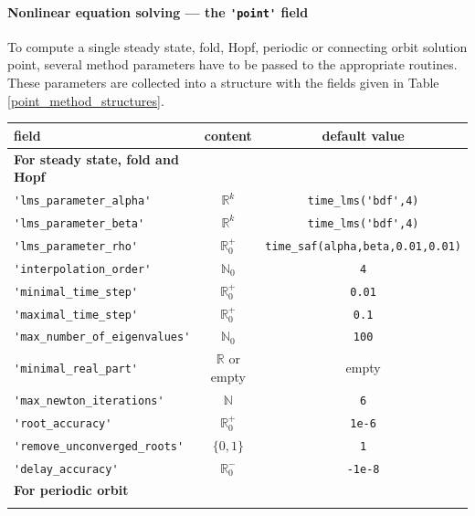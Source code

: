 \documentclass[10pt]{scrartcl}
\newcommand{\RR}{\mathbb{R}}
\newcommand{\NN}{\mathbb{N}}
\newcommand{\blist}[1]{\mbox{\lstinline!#1!}}
\begin{document}
\paragraph{Nonlinear equation solving --- the \blist{'point'} field}
To compute a single steady state, fold, Hopf, periodic 
or connecting
orbit solution point,
several method parameters have to be passed to the appropriate routines.
These parameters are collected into a structure with the fields
given in Table \ref{point_method_structures}.
\begin{table}[htbp]
\begin{center}
\begin{tabular}{l@{\hspace*{1em}}c@{\hspace*{1em}}c}\hline\noalign{\smallskip}
 field                        & content              & default value  \\\hline\noalign{\smallskip} 
\textbf{For steady state, fold and Hopf}\\\noalign{\smallskip}
\blist{'lms_parameter_alpha'}        & $\RR^k$              & \blist{time_lms('bdf',4)} \\
\blist{'lms_parameter_beta'}         & $\RR^k$              & \blist{time_lms('bdf',4)} \\
\blist{'lms_parameter_rho'}          & $\RR^+_0$            & \blist{time_saf(alpha,beta,0.01,0.01)} \\
\blist{'interpolation_order'}         & $\NN_0$              & \blist{4} \\
\blist{'minimal_time_step'}          & $\RR^+_0$            & \blist{0.01} \\
\blist{'maximal_time_step'}          & $\RR^+_0$            & \blist{0.1} \\
\blist{'max_number_of_eigenvalues'} & $\NN_0$              & \blist{100} \\
\blist{'minimal_real_part'}          & $\RR$ or empty       & empty \\
\blist{'max_newton_iterations'}      & $\NN$                & \blist{6} \\ 
\blist{'root_accuracy'}               & $\RR^+_0$            & \blist{1e-6} \\
\blist{'remove_unconverged_roots'}   & $\{0,1\}$            & \blist{1} \\
\blist{'delay_accuracy'}              & $\RR_0^-$            & \blist{-1e-8}
\\\noalign{\medskip}
\textbf{For periodic orbit}\\\noalign{\smallskip}

\end{tabular}
\end{center}
\end{table}
\end{document}
